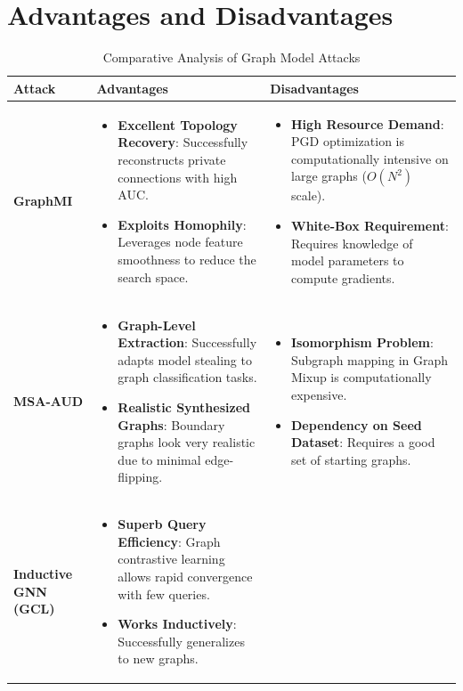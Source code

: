 \documentclass{article}
\begin{document}
\section{Advantages and Disadvantages}

\begin{table}[h]
\centering
\caption{Comparative Analysis of Graph Model Attacks}
\begin{tabular}{p{2cm} p{6.5cm} p{6.5cm}}
\toprule
\textbf{Attack} & \textbf{Advantages} & \textbf{Disadvantages} \\
\midrule
\textbf{GraphMI} & 
\begin{itemize}
    \item \textbf{Excellent Topology Recovery}: Successfully reconstructs private connections with high AUC.
    \item \textbf{Exploits Homophily}: Leverages node feature smoothness to reduce the search space.
\end{itemize} & 
\begin{itemize}
    \item \textbf{High Resource Demand}: PGD optimization is computationally intensive on large graphs ($O(N^2)$ scale).
    \item \textbf{White-Box Requirement}: Requires knowledge of model parameters to compute gradients.
\end{itemize} \\
\midrule
\textbf{MSA-AUD} & 
\begin{itemize}
    \item \textbf{Graph-Level Extraction}: Successfully adapts model stealing to graph classification tasks.
    \item \textbf{Realistic Synthesized Graphs}: Boundary graphs look very realistic due to minimal edge-flipping.
\end{itemize} & 
\begin{itemize}
    \item \textbf{Isomorphism Problem}: Subgraph mapping in Graph Mixup is computationally expensive.
    \item \textbf{Dependency on Seed Dataset}: Requires a good set of starting graphs.
\end{itemize} \\
\midrule
\textbf{Inductive GNN (GCL)} & 
\begin{itemize}
    \item \textbf{Superb Query Efficiency}: Graph contrastive learning allows rapid convergence with few queries.
    \item \textbf{Works Inductively}: Successfully generalizes to new graphs.

\end{itemize}
\end{tabular}
\end{table}
\end{document}
